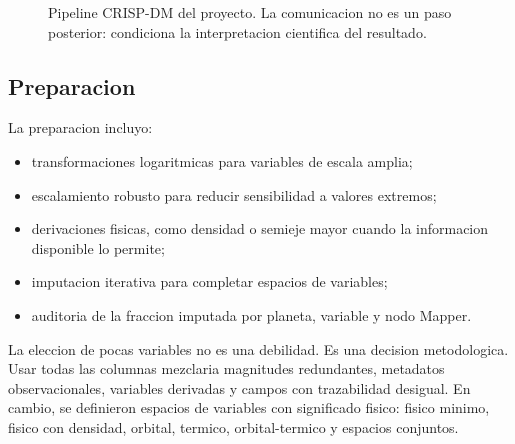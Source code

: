 \documentclass[11pt]{article}
\begin{document}
\begin{figure}[H]
\centering
{}
\caption{Pipeline CRISP-DM del proyecto. La comunicacion no es un paso posterior: condiciona la interpretacion cientifica del resultado.}
\end{figure}

\subsection{Preparacion}

La preparacion incluyo:
\begin{itemize}
  \item transformaciones logaritmicas para variables de escala amplia;
  \item escalamiento robusto para reducir sensibilidad a valores extremos;
  \item derivaciones fisicas, como densidad o semieje mayor cuando la informacion disponible lo permite;
  \item imputacion iterativa para completar espacios de variables;
  \item auditoria de la fraccion imputada por planeta, variable y nodo Mapper.
\end{itemize}

La eleccion de pocas variables no es una debilidad. Es una decision metodologica. Usar todas las columnas mezclaria magnitudes redundantes, metadatos observacionales, variables derivadas y campos con trazabilidad desigual. En cambio, se definieron espacios de variables con significado fisico: fisico minimo, fisico con densidad, orbital, termico, orbital-termico y espacios conjuntos.
\end{document}
